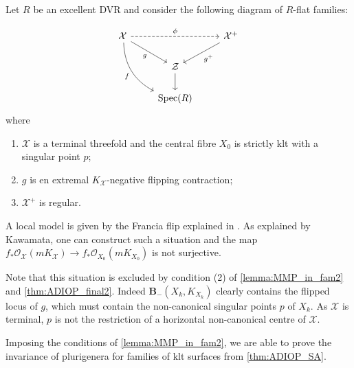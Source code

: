 	\begin{example}	\label{ex-kawamata}
		Let $R$ be an excellent DVR and consider the following diagram of $R$-flat families:
		
		\[\begin{tikzcd}
			\mathcal{X} \ar[rr, dashed, "\phi"] \arrow[rd, "g",swap] \ar[rdd, bend right,
			"f",swap] &   & \mathcal{X}^{+}  \arrow[ld, "g^+"]  \\
			&  \mathcal{Z}    \ar[d]                             & 	\\
			& \Spec(R) &
		\end{tikzcd}
		\] 
		where
		\begin{enumerate}
			\item $\mathcal{X}$ is a terminal threefold and the central fibre  $X_0$ is strictly klt with a singular point $p$;
			\item $g$ is en extremal $K_{\mathcal{X}}$-negative flipping contraction;
			\item $\mathcal{X}^{+}$ is regular.
		\end{enumerate}
		A local model is given by the Francia flip explained in \cite{Kaw99}. 
		As explained by Kawamata, one can construct such a situation and the map
		$f_*\mathcal{O}_{\mathcal{X}}(mK_{\mathcal{X}}) \to f_* \mathcal{O}_{X_0}(mK_{X_0})$ is not surjective.
		
		
		Note that this situation is excluded by condition (2) of \autoref{lemma:MMP_in_fam2} and \autoref{thm:ADIOP_final2}.
		Indeed $\textbf{B}_{-}(X_k, K_{X_k})$ clearly contains the flipped locus of $g$, which must contain the non-canonical singular points $p$ of $X_k$. As $\mathcal{X}$ is terminal, $p$ is not the restriction of a horizontal non-canonical centre of $\mathcal{X}$.
	\end{example}
	

Imposing the conditions of \autoref{lemma:MMP_in_fam2}, we are able to prove the invariance of plurigenera for families of klt surfaces from \autoref{thm:ADIOP_SA}.
	
